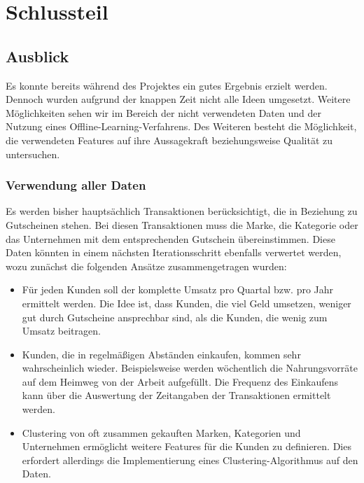 \section{Schlussteil}

\subsection{Ausblick}
Es konnte bereits während des Projektes ein gutes Ergebnis erzielt
werden. Dennoch wurden aufgrund der knappen Zeit nicht alle Ideen
umgesetzt. Weitere Möglichkeiten sehen wir im Bereich der nicht
verwendeten Daten und der Nutzung eines Offline-Learning-Verfahrens.
Des Weiteren besteht die Möglichkeit, die verwendeten Features auf ihre
Aussagekraft beziehungsweise Qualität zu untersuchen.

\subsubsection{Verwendung aller Daten}
Es werden bisher hauptsächlich Transaktionen berücksichtigt, die in Beziehung zu Gutscheinen stehen.
Bei diesen Transaktionen muss die Marke, die Kategorie oder das Unternehmen mit dem entsprechenden Gutschein übereinstimmen.
Diese Daten könnten in einem nächsten Iterationsschritt ebenfalls verwertet werden, wozu zunächst die folgenden Ansätze zusammengetragen wurden:
	
\begin{itemize}
\item Für jeden Kunden soll der komplette Umsatz pro Quartal bzw. pro Jahr ermittelt werden. Die Idee ist, dass Kunden, die viel Geld umsetzen, weniger gut durch Gutscheine ansprechbar sind, als die Kunden, die wenig zum Umsatz beitragen. 
 
\item Kunden, die in regelmäßigen Abständen einkaufen, kommen sehr wahrscheinlich wieder.
Beispielsweise werden wöchentlich die Nahrungsvorräte auf dem Heimweg von der Arbeit aufgefüllt.
Die Frequenz des Einkaufens kann über die Auswertung der Zeitangaben der Transaktionen ermittelt werden.

\item Clustering von oft zusammen gekauften Marken, Kategorien und Unternehmen
ermöglicht weitere Features für die Kunden zu definieren.
Dies erfordert allerdings die Implementierung eines Clustering-Algorithmus
auf den Daten.
\end{itemize}

